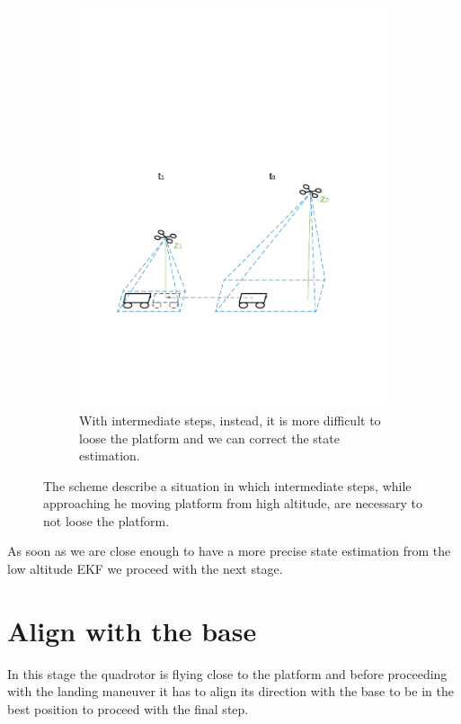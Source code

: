 \begin{figure}[!htbp]
   \begin{subfigure}[b]{0.8\textwidth}
     \includegraphics[width=\textwidth]{img/approach_platform.pdf}
        \caption{With intermediate steps, instead, it is more difficult to loose the platform and we can correct the state estimation.}
        \label{fig:not_loose_platform}
   \end{subfigure}
    \caption{The scheme describe a situation in which intermediate steps, while approaching he moving platform from high altitude, are necessary to not loose the platform.  }
    \label{fig:approach_platform}
\end{figure}

As soon as we are close enough to have a more precise state estimation from the low altitude EKF we proceed with the next stage.

\newpage 
\section{Align with the base}
In this stage the quadrotor is flying close to the platform and before proceeding with the landing maneuver it has to align its direction with the base to be in the best position to proceed with the final step.\\

